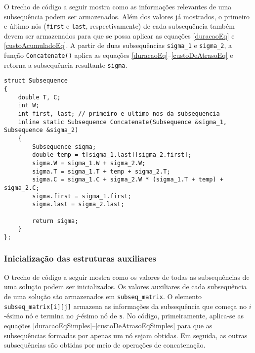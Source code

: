 O trecho de código a seguir mostra como as informações relevantes de uma subsequência podem ser armazenados. Além dos valores já mostrados, o primeiro e último nós (\texttt{first} e \texttt{last}, respectivamente) de cada subsequência também devem ser armazenados para que se possa aplicar as equações \eqref{duracaoEq} e \eqref{custoAcumuladoEq}. A partir de duas subsequências \texttt{sigma\_1} e \texttt{sigma\_2}, a função \texttt{Concatenate()} aplica as equações \eqref{duracaoEq}--\eqref{custoDeAtrasoEq} e retorna a subsequência resultante \texttt{sigma}.

\begin{lstlisting}[style=cplusplusListStyle]
struct Subsequence
{
    double T, C;
    int W;
    int first, last; // primeiro e ultimo nos da subsequencia
    inline static Subsequence Concatenate(Subsequence &sigma_1, Subsequence &sigma_2)
    {
        Subsequence sigma;
        double temp = t[sigma_1.last][sigma_2.first];
        sigma.W = sigma_1.W + sigma_2.W;
        sigma.T = sigma_1.T + temp + sigma_2.T;
        sigma.C = sigma_1.C + sigma_2.W * (sigma_1.T + temp) + sigma_2.C;
        sigma.first = sigma_1.first;
        sigma.last = sigma_2.last;
        
        return sigma;
    }
};
\end{lstlisting}

\subsubsection{Inicialização das estruturas auxiliares}

O trecho de código a seguir mostra como os valores de todas as subsequências de uma solução podem ser inicializados. Os valores auxiliares de cada subsequência de uma solução são armazenados em \texttt{subseq\_matrix}. O elemento \texttt{subseq\_matrix[i][j]} armazena as informações da subsequência que começa no $i$-ésimo nó e termina no $j$-ésimo nó de \texttt{s}. No código, primeiramente, aplica-se as equações \eqref{duracaoEqSimples}--\eqref{custoDeAtrasoEqSimples} para que as subsequências formadas por apenas um nó sejam obtidas. Em seguida, as outras subsequências são obtidas por meio de operações de concatenação.

